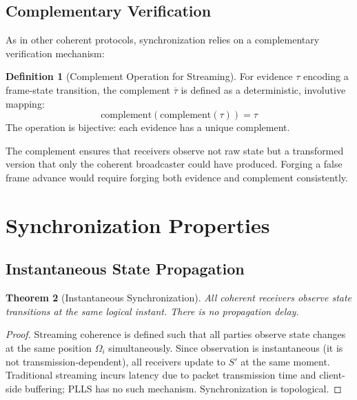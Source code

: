 \documentclass[twocolumn,10pt,a4paper]{article}
\theoremstyle{plain}
\newtheorem{theorem}{Theorem}[section]
\theoremstyle{definition}
\newtheorem{definition}[theorem]{Definition}
\begin{document}
\subsection{Complementary Verification}

As in other coherent protocols, synchronization relies on a complementary verification mechanism:

\begin{definition}[Complement Operation for Streaming]
For evidence $\tau$ encoding a frame-state transition, the complement $\overline{\tau}$ is defined as a deterministic, involutive mapping:
\[
\mathrm{complement}(\mathrm{complement}(\tau)) = \tau
\]
The operation is bijective: each evidence has a unique complement.
\end{definition}

The complement ensures that receivers observe not raw state but a transformed version that only the coherent broadcaster could have produced. Forging a false frame advance would require forging both evidence and complement consistently.

\section{Synchronization Properties}
\label{sec:properties}

\subsection{Instantaneous State Propagation}

\begin{theorem}[Instantaneous Synchronization]
All coherent receivers observe state transitions at the same logical instant. There is no propagation delay.
\end{theorem}

\begin{proof}
Streaming coherence is defined such that all parties observe state changes at the same position $\Omega_i$ simultaneously. Since observation is instantaneous (it is not transmission-dependent), all receivers update to $S'$ at the same moment. Traditional streaming incurs latency due to packet transmission time and client-side buffering; PLLS has no such mechanism. Synchronization is topological.
\end{proof}
\end{document}
